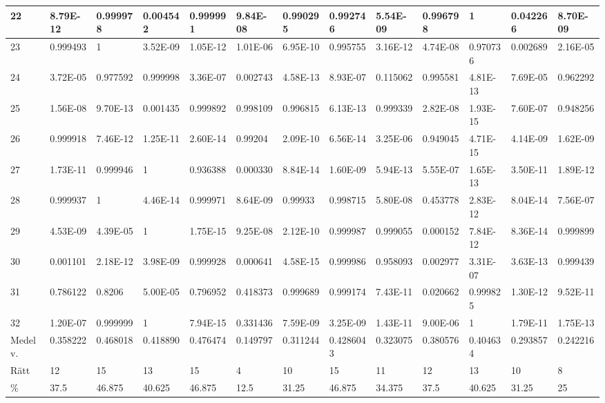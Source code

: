 \documentclass[a4paper,10pt]{article}
\begin{document}
\begin{centering}
{\begin{tabular}{ |l|l|l|l|l|l|l|l|l|l|l|l|l| }
22	       & 8.79E-12 & 0.999978 & 0.004542 & 0.999991 & 9.84E-08 & 0.990295 &  0.992746 & 5.54E-09  & 0.996798 &  1        & 0.042266 & 8.70E-09 \\ \hline       
23	       & 0.999493 & 1        & 3.52E-09 & 1.05E-12 & 1.01E-06 & 6.95E-10 &  0.995755 & 3.16E-12  & 4.74E-08 &  0.970736 & 0.002689 & 2.16E-05 \\ \hline               
24	       & 3.72E-05 & 0.977592 & 0.999998 & 3.36E-07 & 0.002743 & 4.58E-13 &  8.93E-07 & 0.115062  & 0.995581 &  4.81E-13 & 7.69E-05 & 0.962292 \\ \hline             
25	       & 1.56E-08 & 9.70E-13 & 0.001435 & 0.999892 & 0.998109 & 0.996815 &  6.13E-13 & 0.999339  & 2.82E-08 &  1.93E-15 & 7.60E-07 & 0.948256 \\ \hline             
26	       & 0.999918 & 7.46E-12 & 1.25E-11 & 2.60E-14 & 0.99204  & 2.09E-10 &  6.56E-14 & 3.25E-06  & 0.949045 &  4.71E-15 & 4.14E-09 & 1.62E-09 \\ \hline            
27	       & 1.73E-11 & 0.999946 & 1        & 0.936388 & 0.000330 & 8.84E-14 &  1.60E-09 & 5.94E-13  & 5.55E-07 &  1.65E-13 & 3.50E-11 & 1.89E-12 \\ \hline             
28	       & 0.999937 & 1        & 4.46E-14 & 0.999971 & 8.64E-09 & 0.99933  &  0.998715 & 5.80E-08  & 0.453778 &  2.83E-12 & 8.04E-14 & 7.56E-07 \\ \hline            
29	       & 4.53E-09 & 4.39E-05 & 1        & 1.75E-15 & 9.25E-08 & 2.12E-10 &  0.999987 & 0.999055  & 0.000152 &  7.84E-12 & 8.36E-14 & 0.999899 \\ \hline                
30	       & 0.001101 & 2.18E-12 & 3.98E-09 & 0.999928 & 0.000641 & 4.58E-15 &  0.999986 & 0.958093  & 0.002977 &  3.31E-07 & 3.63E-13 & 0.999439 \\ \hline               
31	       & 0.786122 & 0.8206   & 5.00E-05 & 0.796952 & 0.418373 & 0.999689 &  0.999174 & 7.43E-11  & 0.020662 &  0.999825 & 1.30E-12 & 9.52E-11 \\ \hline             
32	       & 1.20E-07 & 0.999999 & 1        & 7.94E-15 & 0.331436 & 7.59E-09 &  3.25E-09 & 1.43E-11  & 9.00E-06 &  1        & 1.79E-11 & 1.75E-13 \\ \hline\hline      
Medelv.    & 0.358222 & 0.468018 & 0.418890 & 0.476474 & 0.149797 & 0.311244 & 0.4286043 & 0.323075  & 0.380576 &  0.404634 & 0.293857 & 0.242216 \\ \hline  
Rätt & 12       & 15       & 13       & 15       & 4        & 10        	 &  15   & 11        & 12       & 13        & 10       & 8 \\ \hline
\%		   & 37.5     & 46.875   & 40.625   & 46.875   & 12.5     & 31.25    & 46.875    & 34.375    & 37.5     & 40.625    & 31.25    & 25 \\ \hline
\end{tabular}

}
\end{centering}
\end{document}
